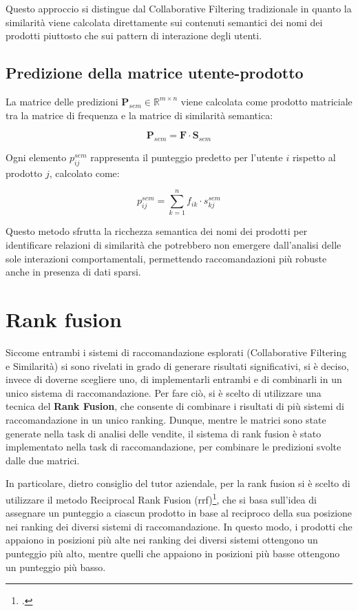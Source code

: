 Questo approccio si distingue dal Collaborative Filtering tradizionale in quanto la similarità viene calcolata direttamente sui contenuti semantici dei nomi dei prodotti piuttosto che sui pattern di interazione degli utenti.

\subsection{Predizione della matrice utente-prodotto}

La matrice delle predizioni $\mathbf{P}_{sem} \in \mathbb{R}^{m \times n}$ viene calcolata come prodotto matriciale tra la matrice di frequenza e la matrice di similarità semantica:

\begin{equation}
\mathbf{P}_{sem} = \mathbf{F} \cdot \mathbf{S}_{sem}
\end{equation}

Ogni elemento $p_{ij}^{sem}$ rappresenta il punteggio predetto per l'utente $i$ rispetto al prodotto $j$, calcolato come:

\begin{equation}
p_{ij}^{sem} = \sum_{k=1}^{n} f_{ik} \cdot s_{kj}^{sem}
\end{equation}

Questo metodo sfrutta la ricchezza semantica dei nomi dei prodotti per identificare relazioni di similarità che potrebbero non emergere dall'analisi delle sole interazioni comportamentali, permettendo raccomandazioni più robuste anche in presenza di dati sparsi.


\section{Rank fusion}

Siccome entrambi i sistemi di raccomandazione esplorati (Collaborative Filtering e Similarità) si sono rivelati in grado di generare risultati significativi, si è deciso, invece di doverne scegliere uno, di implementarli entrambi e di combinarli in un unico sistema di raccomandazione. Per fare ciò, si è scelto di utilizzare una tecnica del \textbf{Rank Fusion}, che consente di combinare i risultati di più sistemi di raccomandazione in un unico ranking.
Dunque, mentre le matrici sono state generate nella task di analisi delle vendite, il sistema di rank fusion è stato implementato nella task di raccomandazione, per combinare le predizioni svolte dalle due matrici.

In particolare, dietro consiglio del tutor aziendale, per la rank fusion si è scelto di utilizzare il metodo Reciprocal Rank Fusion (\gls{rrf})\footcite{site:rrf-explained}, che si basa sull'idea di assegnare un punteggio a ciascun prodotto in base al reciproco della sua posizione nei ranking dei diversi sistemi di raccomandazione. In questo modo, i prodotti che appaiono in posizioni più alte nei ranking dei diversi sistemi ottengono un punteggio più alto, mentre quelli che appaiono in posizioni più basse ottengono un punteggio più basso.

